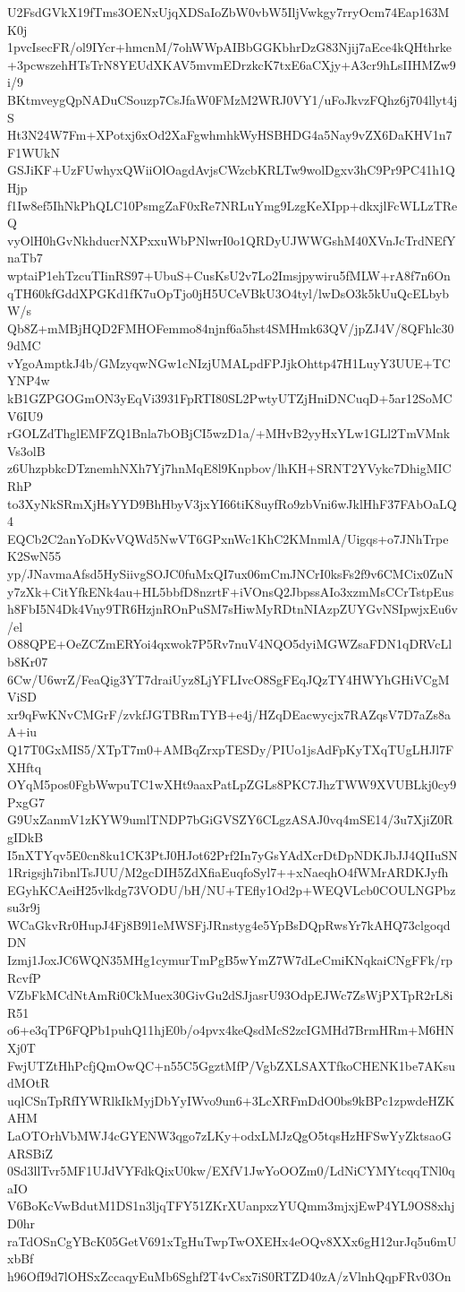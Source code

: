 U2FsdGVkX19fTms3OENxUjqXDSaIoZbW0vbW5IljVwkgy7rryOcm74Eap163MK0j
1pvcIsecFR/ol9IYcr+hmcnM/7ohWWpAIBbGGKbhrDzG83Njij7aEce4kQHthrke
+3pcwszehHTsTrN8YEUdXKAV5mvmEDrzkcK7txE6aCXjy+A3cr9hLsIIHMZw9i/9
BKtmveygQpNADuCSouzp7CsJfaW0FMzM2WRJ0VY1/uFoJkvzFQhz6j704llyt4jS
Ht3N24W7Fm+XPotxj6xOd2XaFgwhmhkWyHSBHDG4a5Nay9vZX6DaKHV1n7F1WUkN
GSJiKF+UzFUwhyxQWiiOlOagdAvjsCWzcbKRLTw9wolDgxv3hC9Pr9PC41h1QHjp
f1Iw8ef5IhNkPhQLC10PsmgZaF0xRe7NRLuYmg9LzgKeXIpp+dkxjlFcWLLzTReQ
vyOlH0hGvNkhducrNXPxxuWbPNlwrI0o1QRDyUJWWGshM40XVnJcTrdNEfYnaTb7
wptaiP1ehTzcuTIinRS97+UbuS+CusKsU2v7Lo2Imsjpywiru5fMLW+rA8f7n6On
qTH60kfGddXPGKd1fK7uOpTjo0jH5UCeVBkU3O4tyl/lwDsO3k5kUuQcELbybW/s
Qb8Z+mMBjHQD2FMHOFemmo84njnf6a5hst4SMHmk63QV/jpZJ4V/8QFhlc309dMC
vYgoAmptkJ4b/GMzyqwNGw1cNIzjUMALpdFPJjkOhttp47H1LuyY3UUE+TCYNP4w
kB1GZPGOGmON3yEqVi3931FpRTI80SL2PwtyUTZjHniDNCuqD+5ar12SoMCV6IU9
rGOLZdThglEMFZQ1Bnla7bOBjCI5wzD1a/+MHvB2yyHxYLw1GLl2TmVMnkVs3olB
z6UhzpbkcDTznemhNXh7Yj7hnMqE8l9Knpbov/lhKH+SRNT2YVykc7DhigMICRhP
to3XyNkSRmXjHsYYD9BhHbyV3jxYI66tiK8uyfRo9zbVni6wJklHhF37FAbOaLQ4
EQCb2C2anYoDKvVQWd5NwVT6GPxnWc1KhC2KMnmlA/Uigqs+o7JNhTrpeK2SwN55
yp/JNavmaAfsd5HySiivgSOJC0fuMxQI7ux06mCmJNCrI0ksFs2f9v6CMCix0ZuN
y7zXk+CitYfkENk4au+HL5bbfD8nzrtF+iVOnsQ2JbpssAIo3xzmMsCCrTstpEus
h8FbI5N4Dk4Vny9TR6HzjnROnPuSM7sHiwMyRDtnNIAzpZUYGvNSIpwjxEu6v/el
O88QPE+OeZCZmERYoi4qxwok7P5Rv7nuV4NQO5dyiMGWZsaFDN1qDRVcLlb8Kr07
6Cw/U6wrZ/FeaQig3YT7draiUyz8LjYFLIvcO8SgFEqJQzTY4HWYhGHiVCgMViSD
xr9qFwKNvCMGrF/zvkfJGTBRmTYB+e4j/HZqDEacwycjx7RAZqsV7D7aZs8aA+iu
Q17T0GxMIS5/XTpT7m0+AMBqZrxpTESDy/PIUo1jsAdFpKyTXqTUgLHJl7FXHftq
OYqM5pos0FgbWwpuTC1wXHt9aaxPatLpZGLs8PKC7JhzTWW9XVUBLkj0cy9PxgG7
G9UxZanmV1zKYW9umlTNDP7bGiGVSZY6CLgzASAJ0vq4mSE14/3u7XjiZ0RgIDkB
I5nXTYqv5E0cn8ku1CK3PtJ0HJot62Prf2In7yGsYAdXcrDtDpNDKJbJJ4QIIuSN
1Rrigsjh7ibnlTsJUU/M2gcDIH5ZdXfiaEuqfoSyl7++xNaeqhO4fWMrARDKJyfh
EGyhKCAeiH25vlkdg73VODU/bH/NU+TEfly1Od2p+WEQVLcb0COULNGPbzsu3r9j
WCaGkvRr0HupJ4Fj8B9l1eMWSFjJRnstyg4e5YpBsDQpRwsYr7kAHQ73clgoqdDN
Izmj1JoxJC6WQN35MHg1cymurTmPgB5wYmZ7W7dLeCmiKNqkaiCNgFFk/rpRcvfP
VZbFkMCdNtAmRi0CkMuex30GivGu2dSJjasrU93OdpEJWc7ZsWjPXTpR2rL8iR51
o6+e3qTP6FQPb1puhQ11hjE0b/o4pvx4keQsdMcS2zcIGMHd7BrmHRm+M6HNXj0T
FwjUTZtHhPcfjQmOwQC+n55C5GgztMfP/VgbZXLSAXTfkoCHENK1be7AKsudMOtR
uqlCSnTpRfIYWRlkIkMyjDbYyIWvo9un6+3LcXRFmDdO0bs9kBPc1zpwdeHZKAHM
LaOTOrhVbMWJ4cGYENW3qgo7zLKy+odxLMJzQgO5tqsHzHFSwYyZktsaoGARSBiZ
0Sd3llTvr5MF1UJdVYFdkQixU0kw/EXfV1JwYoOOZm0/LdNiCYMYtcqqTNl0qaIO
V6BoKcVwBdutM1DS1n3ljqTFY51ZKrXUanpxzYUQmm3mjxjEwP4YL9OS8xhjD0hr
raTdOSnCgYBcK05GetV691xTgHuTwpTwOXEHx4eOQv8XXx6gH12urJq5u6mUxbBf
h96OfI9d7lOHSxZccaqyEuMb6Sghf2T4vCsx7iS0RTZD40zA/zVlnhQqpFRv03On
